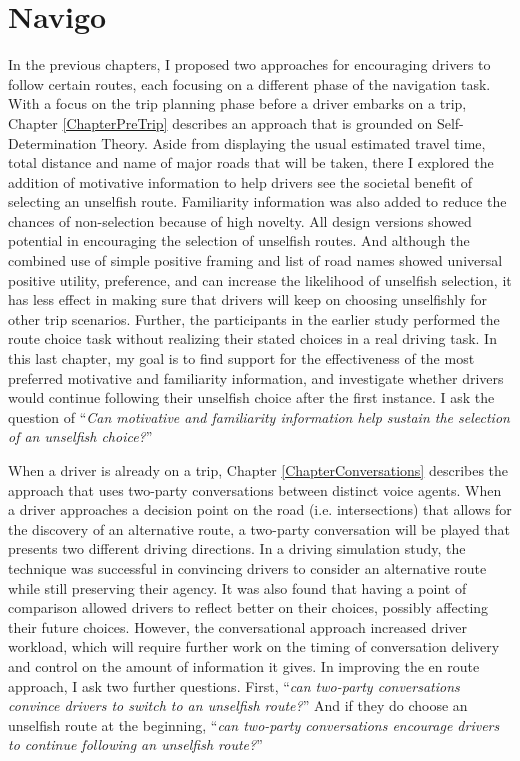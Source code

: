 \chapter{Navigo}
\label{ChapterNavigo}

In the previous chapters, I proposed two approaches for encouraging drivers to follow certain routes, each focusing on a different phase of the navigation task. With a focus on the trip planning phase before a driver embarks on a trip, Chapter \ref{ChapterPreTrip} describes an approach that is grounded on Self-Determination Theory. Aside from displaying the usual estimated travel time, total distance and name of major roads that will be taken, there I explored the addition of motivative information to help drivers see the societal benefit of selecting an unselfish route. Familiarity information was also added to reduce the chances of non-selection because of high novelty. All design versions showed potential in encouraging the selection of unselfish routes. And although the combined use of simple positive framing and list of road names showed universal positive utility, preference, and can increase the likelihood of unselfish selection, it has less effect in making sure that drivers will keep on choosing unselfishly for other trip scenarios. Further, the participants in the earlier study performed the route choice task without realizing their stated choices in a real driving task. In this last chapter, my goal is to find support for the effectiveness of the most preferred motivative and familiarity information, and investigate whether drivers would continue following their unselfish choice after the first instance. I ask the question of ``\textit{Can motivative and familiarity information help sustain the selection of an unselfish choice?}''

When a driver is already on a trip, Chapter \ref{ChapterConversations} describes the approach that uses two-party conversations between distinct voice agents. When a driver approaches a decision point on the road (i.e. intersections) that allows for the discovery of an alternative route, a two-party conversation will be played that presents two different driving directions. In a driving simulation study, the technique was successful in convincing drivers to consider an alternative route while still preserving their agency. It was also found that having a point of comparison allowed drivers to reflect better on their choices, possibly affecting their future choices. However, the conversational approach increased driver workload, which will require further work on the timing of conversation delivery and control on the amount of information it gives. In improving the en route approach, I ask two further questions. First, ``\textit{can two-party conversations convince drivers to switch to an unselfish route?}'' And if they do choose an unselfish route at the beginning, ``\textit{can two-party conversations encourage drivers to continue following an unselfish route?}''

